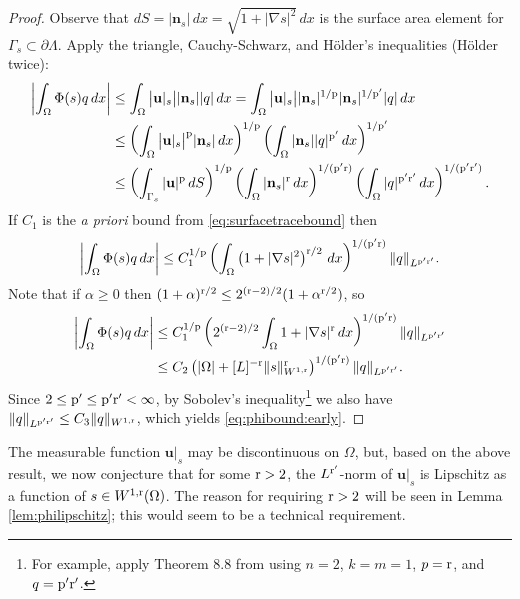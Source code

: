 \documentclass[hidelinks,onefignum,onetabnum,final]{siamart220329}  %
\newcommand{\grad}{\nabla}
\newcommand{\bn}{\mathbf{n}}
\newcommand{\bu}{\mathbf{u}}
\newcommand{\pp}{{\text{\textnormal{p}}}}
\newcommand{\rr}{{\text{\textnormal{r}}}}
\begin{document}
\begin{proof}  Observe that $dS = |\bn_s|\,dx = \sqrt{1+|\grad s|^2}\,dx$ is the surface area element for $\Gamma_s \subset \partial \Lambda$.  Apply the triangle, Cauchy-Schwarz, and H\"older's inequalities (H\"older twice):
\begin{align}
\left|\int_\Omega \Phi(s) q\,dx\right| &\le \int_\Omega \big|\bu|_s\big| |\bn_s| |q|\,dx = \int_\Omega \big|\bu|_s\big| |\bn_s|^{1/\pp} |\bn_s|^{1/\pp'} |q|\,dx \label{eq:phibound:zero} \\
    &\le \left(\int_\Omega \big|\bu|_s\big|^\pp |\bn_s|\,dx\right)^{1/\pp} \left(\int_\Omega |\bn_s| |q|^{\pp'} \,dx\right)^{1/\pp'} \notag \\
    &\le \left(\int_{\Gamma_s} |\bu|^\pp \,dS\right)^{1/\pp} \left(\int_\Omega |\bn_s|^\rr \,dx\right)^{1/(\pp'\rr)} \left(\int_\Omega |q|^{\pp'\rr'} \,dx\right)^{1/(\pp'\rr')}. \notag
\end{align}
If $C_1$ is the \emph{a priori} bound from \eqref{eq:surfacetracebound} then
\begin{equation}
\left|\int_\Omega \Phi(s) q\,dx\right| \le C_1^{1/\pp} \left(\int_\Omega \left(1+|\grad s|^2\right)^{\rr/2}\,dx\right)^{1/(\pp'\rr)} \|q\|_{L^{\pp'\rr'}}.
\end{equation}
Note that if $\alpha\ge 0$ then $(1+\alpha)^{\rr/2} \le 2^{(\rr-2)/2} (1+\alpha^{\rr/2})$, so
\begin{align}
\left|\int_\Omega \Phi(s) q\,dx\right| &\le C_1^{1/\pp} \left(2^{(\rr-2)/2} \int_\Omega 1 + |\grad s|^\rr\,dx\right)^{1/(\pp'\rr)} \|q\|_{L^{\pp'\rr'}} \label{eq:phibound:one} \\
  &\le C_2 \left(|\Omega| + [L]^{-\rr}\|s\|_{W^{1,\rr}}^\rr\right)^{1/(\pp'\rr)} \|q\|_{L^{\pp'\rr'}}. \notag
\end{align}
Since $2 \le \pp' \le \pp'\rr' < \infty$, by Sobolev's inequality\footnote{For example, apply Theorem 8.8 from \cite{LiebLoss1997} using $n=2$, $k=m=1$, $p=\rr$, and $q=\pp'\rr'$.} we also have $\|q\|_{L^{\pp'\rr'}} \le C_3 \|q\|_{W^{1,\rr}}$, which yields \eqref{eq:phibound:early}.
\end{proof}

The measurable function $\bu|_s$ may be discontinuous on $\Omega$, but, based on the above result, we now conjecture that for some $\rr>2$, the $L^{\rr'}$-norm of $\bu|_s$ is Lipschitz as a function of $s \in W^{1,\rr}(\Omega)$.  The reason for requiring $\rr>2$ will be seen in Lemma \ref{lem:philipschitz}; this would seem to be a technical requirement.
\end{document}
